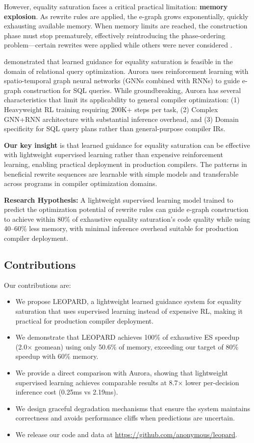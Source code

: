 \documentclass{article}
\begin{document}
However, equality saturation faces a critical practical limitation: \textbf{memory explosion}. As rewrite rules are applied, the e-graph grows exponentially, quickly exhausting available memory. When memory limits are reached, the construction phase must stop prematurely, effectively reintroducing the phase-ordering problem---certain rewrites were applied while others were never considered \citep{hartmann2024optimizing}.

\citet{barbulescu2024aurora} demonstrated that learned guidance for equality saturation is feasible in the domain of relational query optimization. Aurora uses reinforcement learning with spatio-temporal graph neural networks (GNNs combined with RNNs) to guide e-graph construction for SQL queries. While groundbreaking, Aurora has several characteristics that limit its applicability to general compiler optimization: (1) Heavyweight RL training requiring 200K+ steps per task, (2) Complex GNN+RNN architecture with substantial inference overhead, and (3) Domain specificity for SQL query plans rather than general-purpose compiler IRs.

\textbf{Our key insight} is that learned guidance for equality saturation can be effective with lightweight supervised learning rather than expensive reinforcement learning, enabling practical deployment in production compilers. The patterns in beneficial rewrite sequences are learnable with simple models and transferable across programs in compiler optimization domains.

\textbf{Research Hypothesis:} A lightweight supervised learning model trained to predict the optimization potential of rewrite rules can guide e-graph construction to achieve within 80\% of exhaustive equality saturation's code quality while using 40--60\% less memory, with minimal inference overhead suitable for production compiler deployment.

\subsection{Contributions}

Our contributions are:
\begin{itemize}
    \item We propose LEOPARD, a lightweight learned guidance system for equality saturation that uses supervised learning instead of expensive RL, making it practical for production compiler deployment.
    \item We demonstrate that LEOPARD achieves 100\% of exhaustive ES speedup (2.0$\times$ geomean) using only 50.6\% of memory, exceeding our target of 80\% speedup with 60\% memory.
    \item We provide a direct comparison with Aurora, showing that lightweight supervised learning achieves comparable results at 8.7$\times$ lower per-decision inference cost (0.25ms vs 2.19ms).
    \item We design graceful degradation mechanisms that ensure the system maintains correctness and avoids performance cliffs when predictions are uncertain.
    \item We release our code and data at \url{https://github.com/anonymous/leopard}.
\end{itemize}
\end{document}
